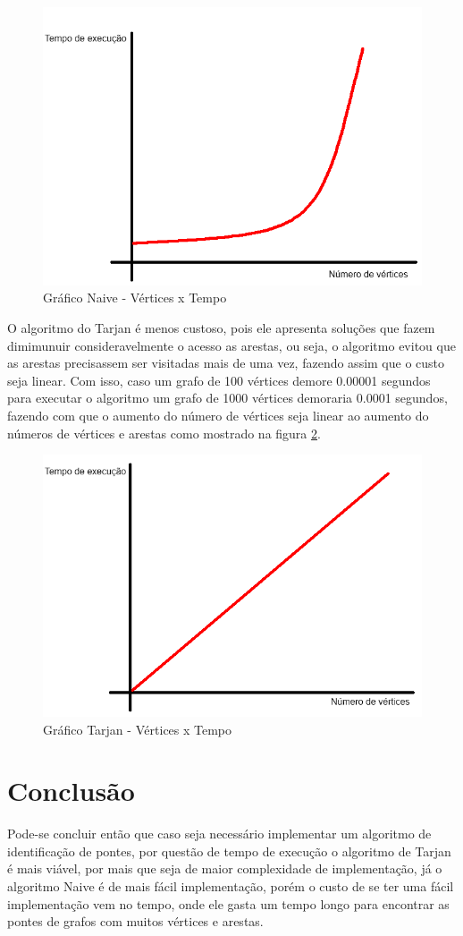 \begin{figure}[ht]
    \centering
    \includegraphics[width=.6\textwidth]{figuras/exponencial_naive.png}
    \caption{Gráfico Naive - Vértices x Tempo}
    \label{fig:figure7}
\end{figure}

O algoritmo do Tarjan é menos custoso, pois ele apresenta soluções que fazem dimimunuir consideravelmente o acesso as arestas, ou seja, o algoritmo evitou que as arestas precisassem ser visitadas mais de uma vez, fazendo assim que o custo seja linear. Com isso, caso um grafo de 100 vértices demore 0.00001 segundos para executar o algoritmo um grafo de 1000 vértices demoraria 0.0001 segundos, fazendo com que o aumento do número de vértices seja linear ao aumento do números de vértices e arestas como mostrado na figura \ref{fig:figure8}.

\begin{figure}[ht]
    \centering
    \includegraphics[width=.6\textwidth]{figuras/linear_tarjan.png}
    \caption{Gráfico Tarjan - Vértices x Tempo}
    \label{fig:figure8}
\end{figure}

\section{\esp Conclusão}
Pode-se concluir então que caso seja necessário implementar um algoritmo de identificação de pontes, por questão de tempo de execução o algoritmo de Tarjan é mais viável, por mais que seja de maior complexidade de implementação, já o algoritmo Naive é de mais fácil implementação, porém o custo de se ter uma fácil implementação vem no tempo, onde ele gasta um tempo longo para encontrar as pontes de grafos com muitos vértices e arestas.